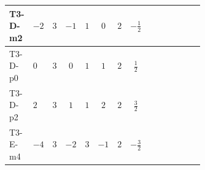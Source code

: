\documentclass[8pt]{article}
\begin{document}
\begin{landscape}
\begin{longtable}{@{}llcccccc >{\raggedright\arraybackslash}p{0.21\linewidth} >{\raggedright\arraybackslash}p{0.21\linewidth} >{\raggedright\arraybackslash}p{0.21\linewidth}@{}}
\midrule
T3-D-m2 & $-2$ & $3$ & $-1$ & $1$ & $0$ & $2$ & $-\frac{1}{2}$ & \scriptsize\adjustbox{max width=\linewidth}{$\begin{gathered} -12 \operatorname{Tr}\!\left({Y_u}\,\left({Y_u}\right)^{\dagger}\,{Y_u}\,\left({Y_u}\right)^{\dagger}\right)\end{gathered}$} & \scriptsize\adjustbox{max width=\linewidth}{$\begin{gathered} +4 {\lambda_5} \left({\lambda_5}\right)^{*}\end{gathered}$} & \scriptsize\adjustbox{max width=\linewidth}{$\begin{gathered} +\frac{9 {g_2}^4}{4}\end{gathered}$} \\
\midrule
T3-D-p0 & $0$ & $3$ & $0$ & $1$ & $1$ & $2$ & $\frac{1}{2}$ & \scriptsize\adjustbox{max width=\linewidth}{$\begin{gathered} -12 \operatorname{Tr}\!\left({Y_u}\,\left({Y_u}\right)^{\dagger}\,{Y_u}\,\left({Y_u}\right)^{\dagger}\right)\end{gathered}$} & \scriptsize\adjustbox{max width=\linewidth}{$\begin{gathered} +4 {\lambda_5} \left({\lambda_5}\right)^{*}\end{gathered}$} & \scriptsize\adjustbox{max width=\linewidth}{$\begin{gathered} +\frac{9 {g_2}^4}{4}\end{gathered}$} \\
\midrule
T3-D-p2 & $2$ & $3$ & $1$ & $1$ & $2$ & $2$ & $\frac{3}{2}$ & \scriptsize\adjustbox{max width=\linewidth}{$\begin{gathered} -12 \operatorname{Tr}\!\left({Y_u}\,\left({Y_u}\right)^{\dagger}\,{Y_u}\,\left({Y_u}\right)^{\dagger}\right)\end{gathered}$} & \scriptsize\adjustbox{max width=\linewidth}{$\begin{gathered} +4 {\lambda_5} \left({\lambda_5}\right)^{*}\end{gathered}$} & \scriptsize\adjustbox{max width=\linewidth}{$\begin{gathered} +\frac{9 {g_2}^4}{4}\end{gathered}$} \\
\midrule
T3-E-m4 & $-4$ & $3$ & $-2$ & $3$ & $-1$ & $2$ & $-\frac{3}{2}$ & \scriptsize\adjustbox{max width=\linewidth}{$\begin{gathered} -12 \operatorname{Tr}\!\left({Y_u}\,\left({Y_u}\right)^{\dagger}\,{Y_u}\,\left({Y_u}\right)^{\dagger}\right)\end{gathered}$} & \scriptsize\adjustbox{max width=\linewidth}{$\begin{gathered} +4 {\lambda_5} \left({\lambda_5}\right)^{*}\end{gathered}$} & \scriptsize\adjustbox{max width=\linewidth}{$\begin{gathered} +\frac{9 {g_2}^4}{4}\end{gathered}$} \\

\end{longtable}
\end{landscape}
\end{document}
